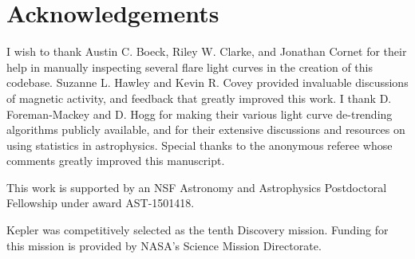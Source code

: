 \documentclass[twocolumn]{aastex6}
\begin{document}
\section*{Acknowledgements}


I wish to thank Austin C. Boeck, Riley W. Clarke, and Jonathan Cornet for their help in manually inspecting several flare light curves in the creation of this codebase. Suzanne L. Hawley and Kevin R. Covey provided invaluable discussions of magnetic activity, and feedback that greatly improved this work. I thank D. Foreman-Mackey and D. Hogg for making their various light curve de-trending algorithms publicly available, and for their extensive discussions and resources on using statistics in astrophysics. Special thanks to the anonymous referee whose comments greatly improved this manuscript.

This work is supported by an NSF Astronomy and Astrophysics Postdoctoral Fellowship under award AST-1501418.

Kepler was competitively selected as the tenth Discovery mission. Funding for this mission is provided by NASA's Science Mission Directorate.
\end{document}
